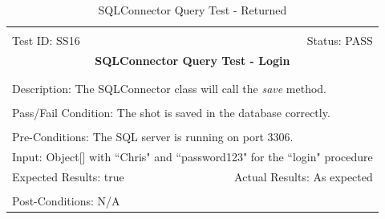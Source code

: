 \documentclass[11pt]{article}
\begin{document}
\begin{center}
\begin{table}[H]
\begin{tabular}{|l r|}\hline&\\[-2mm]
	Test ID: SS16	&Status: PASS\\[-3mm]
	\multicolumn{2}{|c|}{\textbf{\large{SQLConnector Query Test - Login}}}\\&\\\hline&\\[-3mm]
	\multicolumn{2}{|p{\textwidth}|}{Description: The SQLConnector class will call the \textit{save} method.}\\[1mm]\hline&\\[-3mm]
	\multicolumn{2}{|p{\textwidth}|}{Pass/Fail Condition: The shot is saved in the database correctly.}\\[1mm]\hline&\\[-3mm]
	\multicolumn{2}{|p{\textwidth}|}{Pre-Conditions: The SQL server is running on port 3306.}\\[4mm]
	\multicolumn{2}{|p{\textwidth}|}{Input: Object[] with ``Chris" and ``password123" for the ``login" procedure}\\[2mm]\hline
	\multicolumn{1}{|p{0.49\textwidth}}{Expected Results: true}	&\multicolumn{1}{|p{0.45\textwidth}|}{Actual Results: As expected}\\\hline&\\[-3mm]
	\multicolumn{2}{|p{\textwidth}|}{Post-Conditions: N/A}\\\hline
\end{tabular}
\caption{SQLConnector Query Test - Returned}
\end{table}
\end{center}
\end{document}
